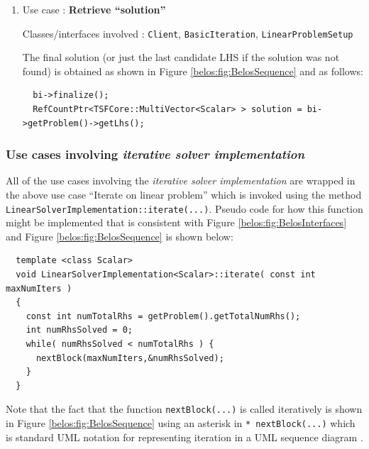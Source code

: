 \documentclass[pdf,ps2pdf,11pt]{SANDreport}
\begin{document}
\begin{enumerate}
{}\item Use case : \textbf{Retrieve ``solution''}

{}\noindent{}Classes/interfaces involved : {}\texttt{Client},
{}\texttt{Basic\-Iteration}, {}\texttt{Linear\-Problem\-Setup}

The final solution (or just the last candidate LHS if the solution was
not found) is obtained as shown in Figure
{}\ref{belos:fig:BelosSequence} and as follows:

{\scriptsize\begin{verbatim}
  bi->finalize();
  RefCountPtr<TSFCore::MultiVector<Scalar> > solution = bi->getProblem()->getLhs();
\end{verbatim}}

\end{enumerate}

\subsubsection*{Use cases involving {}\textit{iterative solver implementation}}

All of the use cases involving the {}\textit{iterative solver
implementation} are wrapped in the above use case ``Iterate on linear
problem'' which is invoked using the method
{}\texttt{Linear\-Solver\-Implementation::\-iterate(...)}.  Pseudo
code for how this function might be implemented that is consistent
with Figure {}\ref{belos:fig:BelosInterfaces} and Figure
{}\ref{belos:fig:BelosSequence} is shown below:

{\scriptsize\begin{verbatim}
  template <class Scalar>
  void LinearSolverImplementation<Scalar>::iterate( const int maxNumIters )
  { 
    const int numTotalRhs = getProblem().getTotalNumRhs();
    int numRhsSolved = 0;
    while( numRhsSolved < numTotalRhs ) {
      nextBlock(maxNumIters,&numRhsSolved);
    }
  }
\end{verbatim}}

Note that the fact that the function {}\texttt{nextBlock(...)} is
called iteratively is shown in Figure {}\ref{belos:fig:BelosSequence}
using an asterisk in {}\texttt{* nextBlock(...)} which is standard UML
notation for representing iteration in a UML sequence diagram
{}\cite{ref:uml_distilled_2nd_ed}.
\end{document}
